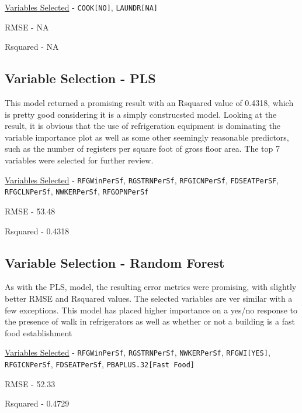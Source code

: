 \begin{myitemize}
\item \hyperref[appendix:electricity:pca]{Variables Selected} - \lstinline{COOK[NO]}, \lstinline{LAUNDR[NA]}
\item RMSE - NA
\item Rsquared - NA
\end{myitemize}

\subsection{Variable Selection - PLS}

This model returned a promising result with an Rsquared value of 0.4318, which is pretty good considering it is a simply construcsted model.  Looking at the result, it is obvious that the use of refrigeration equipment is dominating the variable importance plot as well as some other seemingly reasonable predictors, such as the number of registers per square foot of gross floor area.  The top 7 variables were selected for further review.

\begin{myitemize}
\item \hyperref[appendix:electricity:pls]{Variables Selected} - \lstinline{RFGWinPerSf}, \lstinline{RGSTRNPerSf}, \lstinline{RFGICNPerSf}, \lstinline{FDSEATPerSF}, \lstinline{RFGCLNPerSf}, \lstinline{NWKERPerSf}, \lstinline{RFGOPNPerSf}
\item RMSE - 53.48
\item Rsquared - 0.4318
\end{myitemize}

\subsection{Variable Selection - Random Forest}

As with the PLS, model, the resulting error metrics were promising, with slightly better RMSE and Rsquared values.  The selected variables are ver similar with a few exceptions.  This model has placed higher importance on a yes/no response to the presence of walk in refrigerators as well as whether or not a building is a fast food establishment

\begin{myitemize}
\item \hyperref[appendix:electricity:rf]{Variables Selected} - \lstinline{RFGWinPerSf}, \lstinline{RGSTRNPerSf}, \lstinline{NWKERPerSf}, \lstinline{RFGWI[YES]}, \lstinline{RFGICNPerSf}, \lstinline{FDSEATPerSf}, \lstinline{PBAPLUS.32[Fast Food]}
\item RMSE - 52.33
\item Rsquared - 0.4729
\end{myitemize}

